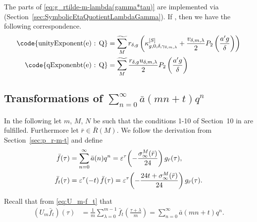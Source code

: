\documentclass{article}
\begin{document}
The parts of \eqref{eq:g_rtilde-m-lambda(gamma*tau)} are
implemented via
\textcolor{blue}{}
(Section~\ref{sec:SymbolicEtaQuotientLambdaGamma}).
%
If , then
we have the following correspondence.
\begin{align*}
  \text{\code{unityExponent(e) : Q}}
  &=
    \gensum[M]
    r_{\delta,g}
    \left(
    \kappa_{g,0,\delta,\gamma_{\delta,m,\lambda}}^{[S]}
    +
    \frac{v_{\delta,m,\lambda}}{2} P_2\left(\frac{a' g}{\delta}\right)
    \right)
  \\
  \text{\code{qExponenbt(e) : Q}}
  &=
    \gensum[M]
    \frac{r_{\delta,g} u_{\delta,m,\lambda}}{2} P_2\left(\frac{a' g}{\delta}\right)
\end{align*}



\subsection{Transformations of $\sum_{n=0}^\infty \bar{a}(mn+t) q^n$}
\label{sec:p_rbar-m-t}

In the following let $m$, $M$, $N$ be such that the conditions 1-10 of
Section~10 in
\cite{ChenDuZhao_FindingModularFunctionsRamanujan_2019} are
fulfilled.
Furthermore let $\bar{r}\in\bar{R}(M)$.
%
We follow the derivation from Section~\ref{sec:p_r-m-t} and
define
\begin{align*}
  \bar{f}(\tau)
  &=
  \sum_{n=0}^\infty \bar{a}(n) q^n
    =
    \unityPowerTau{-\frac{\sigmainfty[M]{\bar{r}}}{24}} g_{\bar{r}}(\tau),
  \\
  \bar{f}_t(\tau)
  &=
    \unityPowerTau{- t} \bar{f}(\tau)
    =
    \unityPowerTau{-\frac{24t + \sigmainfty[M]{\bar{r}}}{24}} g_{\bar{r}}(\tau).
\end{align*}

Recall that from \eqref{eq:U_m-f_t} that
\begin{align}
  (U_m\bar{f}_t)(\tau)
  &=
  \frac{1}{m} \sum_{\lambda=0}^{m-1}\bar{f}_t\left(\frac{\tau+\lambda}{m}\right)
  =
    \sum_{n=0}^\infty \bar{a}(mn+t) q^n.
  \label{eq:U_m-fbar_t}
\end{align}
\end{document}
